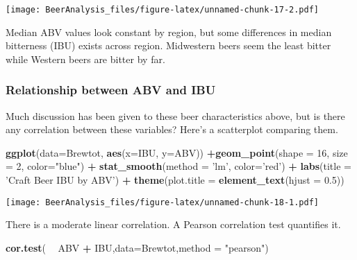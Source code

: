 \documentclass[]{article}
\newenvironment{Shaded}{\begin{snugshade}}{\end{snugshade}}
\newcommand{\DataTypeTok}[1]{\textcolor[rgb]{0.13,0.29,0.53}{#1}}
\newcommand{\DecValTok}[1]{\textcolor[rgb]{0.00,0.00,0.81}{#1}}
\newcommand{\FloatTok}[1]{\textcolor[rgb]{0.00,0.00,0.81}{#1}}
\newcommand{\KeywordTok}[1]{\textcolor[rgb]{0.13,0.29,0.53}{\textbf{#1}}}
\newcommand{\NormalTok}[1]{#1}
\newcommand{\OperatorTok}[1]{\textcolor[rgb]{0.81,0.36,0.00}{\textbf{#1}}}
\newcommand{\StringTok}[1]{\textcolor[rgb]{0.31,0.60,0.02}{#1}}
\begin{document}
\texttt{[image: BeerAnalysis\_files/figure-latex/unnamed-chunk-17-2.pdf]}

Median ABV values look constant by region, but some differences in
median bitterness (IBU) exists across region. Midwestern beers seem the
least bitter while Western beers are bitter by far.

\hypertarget{relationship-between-abv-and-ibu}{%
\subsubsection{Relationship between ABV and
IBU}\label{relationship-between-abv-and-ibu}}

Much discussion has been given to these beer characteristics above, but
is there any correlation between these variables? Here's a scatterplot
comparing them.

\begin{Shaded}
\begin{Highlighting}[]
\KeywordTok{ggplot}\NormalTok{(}\DataTypeTok{data=}\NormalTok{Brewtot, }\KeywordTok{aes}\NormalTok{(}\DataTypeTok{x=}\NormalTok{IBU, }\DataTypeTok{y=}\NormalTok{ABV)) }\OperatorTok{+}\KeywordTok{geom_point}\NormalTok{(}\DataTypeTok{shape =} \DecValTok{16}\NormalTok{, }\DataTypeTok{size =} \DecValTok{2}\NormalTok{, }\DataTypeTok{color=}\StringTok{"blue"}\NormalTok{) }\OperatorTok{+}\StringTok{ }\KeywordTok{stat_smooth}\NormalTok{(}\DataTypeTok{method =} \StringTok{'lm'}\NormalTok{, }\DataTypeTok{color=}\StringTok{'red'}\NormalTok{) }\OperatorTok{+}\StringTok{ }\KeywordTok{labs}\NormalTok{(}\DataTypeTok{title =} \StringTok{'Craft Beer IBU by ABV'}\NormalTok{) }\OperatorTok{+}\StringTok{ }\KeywordTok{theme}\NormalTok{(}\DataTypeTok{plot.title =} \KeywordTok{element_text}\NormalTok{(}\DataTypeTok{hjust =} \FloatTok{0.5}\NormalTok{))}
\end{Highlighting}
\end{Shaded}

\texttt{[image: BeerAnalysis\_files/figure-latex/unnamed-chunk-18-1.pdf]}

There is a moderate linear correlation. A Pearson correlation test
quantifies it.

\begin{Shaded}
\begin{Highlighting}[]
\KeywordTok{cor.test}\NormalTok{( }\OperatorTok{~}\StringTok{ }\NormalTok{ABV }\OperatorTok{+}\StringTok{ }\NormalTok{IBU,}\DataTypeTok{data=}\NormalTok{Brewtot,}\DataTypeTok{method =} \StringTok{"pearson"}\NormalTok{)}
\end{Highlighting}
\end{Shaded}
\end{document}
